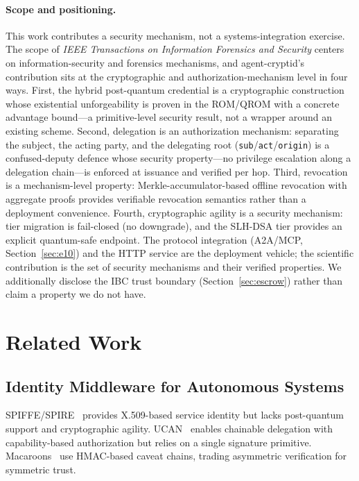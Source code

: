 \documentclass[10pt,twocolumn]{IEEEtran}
\begin{document}
\paragraph{Scope and positioning.}
This work contributes a security mechanism, not a systems-integration
exercise. The scope of \emph{IEEE Transactions on Information Forensics
and Security} centers on information-security and forensics mechanisms,
and agent-cryptid's contribution sits at the cryptographic and
authorization-mechanism level in four ways. First, the hybrid
post-quantum credential is a cryptographic construction whose existential
unforgeability is proven in the ROM/QROM with a concrete advantage
bound---a primitive-level security result, not a wrapper around an
existing scheme. Second, delegation is an authorization mechanism:
separating the subject, the acting party, and the delegating root
(\texttt{sub}/\texttt{act}/\texttt{origin}) is a confused-deputy defence
whose security property---no privilege escalation along a delegation
chain---is enforced at issuance and verified per hop. Third, revocation
is a mechanism-level property: Merkle-accumulator-based offline
revocation with aggregate proofs provides verifiable revocation semantics
rather than a deployment convenience. Fourth, cryptographic agility is a
security mechanism: tier migration is fail-closed (no downgrade), and
the SLH-DSA tier provides an explicit quantum-safe endpoint. The protocol
integration (A2A/MCP, Section~\ref{sec:e10}) and the HTTP service are the
deployment vehicle; the scientific contribution is the set of security
mechanisms and their verified properties. We additionally disclose the
IBC trust boundary (Section~\ref{sec:escrow}) rather than claim a
property we do not have.

\section{Related Work}

\subsection{Identity Middleware for Autonomous Systems}

SPIFFE/SPIRE~\cite{ref:spiffe} provides X.509-based service identity but
lacks post-quantum support and cryptographic agility. UCAN~\cite{ref:ucan}
enables chainable delegation with capability-based authorization but relies
on a single signature primitive. Macaroons~\cite{ref:macaroon} use HMAC-based
caveat chains, trading asymmetric verification for symmetric trust.
\end{document}
